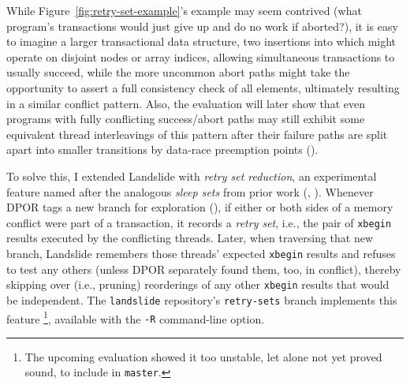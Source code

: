 While Figure~\ref{fig:retry-set-example}'s example may seem contrived
(what program's transactions would just give up and do no work if aborted?),
it is easy to imagine a larger transactional data structure,
two insertions into which might operate on disjoint nodes or array indices,
allowing simultaneous transactions to usually succeed,
while the more uncommon abort paths might take the opportunity to assert a full consistency check of all elements,
ultimately resulting in a similar conflict pattern.
Also, the evaluation will later show
that even programs with fully conflicting success/abort paths
may still exhibit some equivalent thread interleavings of this pattern
after their failure paths are split apart into smaller transitions by data-race preemption points
(\sect{\ref{sec:tm-eval-retrysets}}).

To solve this,
I extended Landslide
with {\em retry set reduction},
an experimental feature named after the analogous {\em sleep sets} from prior work
(\cite{partial-order-methods,dpor,optimal-dpor}, \sect{\ref{sec:landslide-sleepsets}}).
Whenever DPOR tags a new branch for exploration (\sect{\ref{sec:landslide-explore}}),
if either or both sides of a memory conflict were part of a transaction,
it records a {\em retry set},
i.e., the pair of {\tt xbegin} results executed by the conflicting threads.
Later, when traversing that new branch,
Landslide remembers those threads' expected {\tt xbegin} results
and refuses to test any others
(unless DPOR separately found them, too, in conflict),
thereby skipping over (i.e., pruning) reorderings of any other {\tt xbegin} results that would be independent.
The {\tt landslide} repository's {\tt retry-sets} branch implements this feature%
\footnote{The upcoming evaluation showed it too unstable, let alone not yet proved sound, to include in {\tt master}.},
available with the {\tt -R} command-line option.


